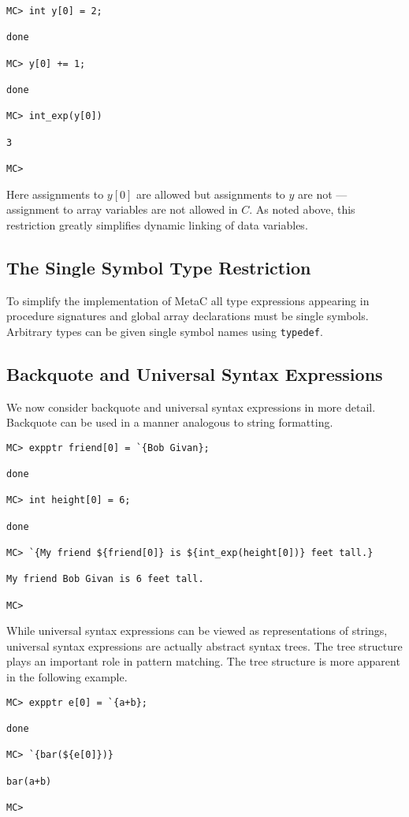 \documentclass{article}
\begin{document}
\begin{verbatim}
MC> int y[0] = 2;

done

MC> y[0] += 1;

done

MC> int_exp(y[0])

3

MC>
\end{verbatim}

Here assignments to $y[0]$ are allowed but assignments to $y$ are not --- assignment to array variables
are not allowed in $C$. As noted above, this restriction greatly simplifies dynamic linking of data variables.

\subsection{The Single Symbol Type Restriction}

To simplify the implementation of MetaC all type expressions appearing in procedure signatures and global array declarations must be single symbols.
Arbitrary types can be given single symbol names using {\tt typedef}.

\subsection{Backquote and Universal Syntax Expressions}

We now consider backquote and universal syntax expressions in more detail.  Backquote can be used in a manner analogous to string formatting.

\begin{verbatim}
MC> expptr friend[0] = `{Bob Givan};

done

MC> int height[0] = 6;

done

MC> `{My friend ${friend[0]} is ${int_exp(height[0])} feet tall.}

My friend Bob Givan is 6 feet tall.

MC> 
\end{verbatim}

While universal syntax expressions can be viewed as representations of strings, universal syntax
expressions are actually abstract syntax trees. The tree structure
plays an important role in pattern matching. The tree structure is
more apparent in the following example.

\begin{verbatim}
MC> expptr e[0] = `{a+b};

done

MC> `{bar(${e[0]})}

bar(a+b)

MC>
\end{verbatim}
\end{document}
